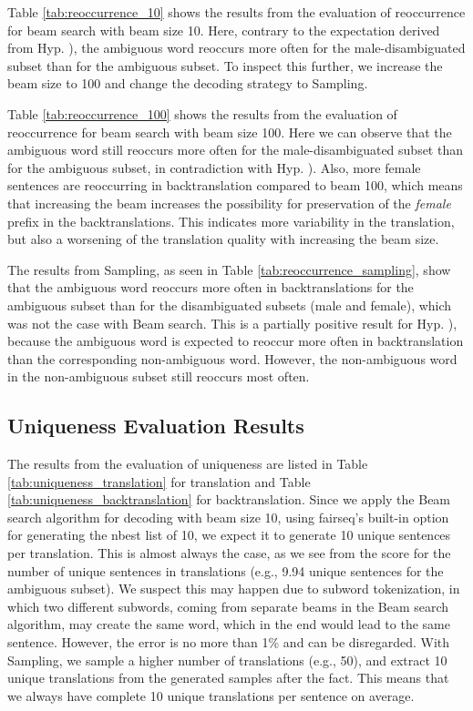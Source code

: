 Table \ref{tab:reoccurrence_10} shows the results from the evaluation of reoccurrence for beam search with beam size 10. Here, contrary to the expectation derived from Hyp. ), the ambiguous word reoccurs more often for the male-disambiguated subset than for the ambiguous subset. To inspect this further, we increase the beam size to 100 and change the decoding strategy to Sampling.

Table \ref{tab:reoccurrence_100} shows the results from the evaluation of reoccurrence for beam search with beam size 100. Here we can observe that the ambiguous word still reoccurs more often for the male-disambiguated subset than for the ambiguous subset, in contradiction with Hyp. ).
Also, more female sentences are reoccurring in backtranslation compared to beam 100, which means that increasing the beam increases the possibility for preservation of the \textit{female} prefix in the backtranslations. This indicates more variability in the translation, but also a worsening of the translation quality with increasing the beam size.

The results from Sampling, as seen in Table \ref{tab:reoccurrence_sampling}, show that the ambiguous word reoccurs more often in backtranslations for the ambiguous subset than for the disambiguated subsets (male and female), which was not the case with Beam search. This is a partially positive result for Hyp. ), because the ambiguous word is expected to reoccur more often in backtranslation than the corresponding non-ambiguous word. However, the non-ambiguous word in the non-ambiguous subset still reoccurs most often.

\subsection{Uniqueness Evaluation Results}
\label{ch:Base_Experiment:Results:Uniqueness}

The results from the evaluation of uniqueness are listed in Table \ref{tab:uniqueness_translation} for translation and Table \ref{tab:uniqueness_backtranslation} for backtranslation.
Since we apply the Beam search algorithm for decoding with beam size 10, using fairseq's built-in option for generating the nbest list of 10, we expect it to generate 10 unique sentences per translation. This is almost always the case, as we see from the score for the number of unique sentences in translations (e.g., 9.94 unique sentences for the ambiguous subset). We suspect this may happen due to subword tokenization, in which two different subwords, coming from separate beams in the Beam search algorithm, may create the same word, which in the end would lead to the same sentence. However, the error is no more than 1\% and can be disregarded.
With Sampling, we sample a higher number of translations (e.g., 50), and extract 10 unique translations from the generated samples after the fact. This means that we always have complete 10 unique translations per sentence on average.

